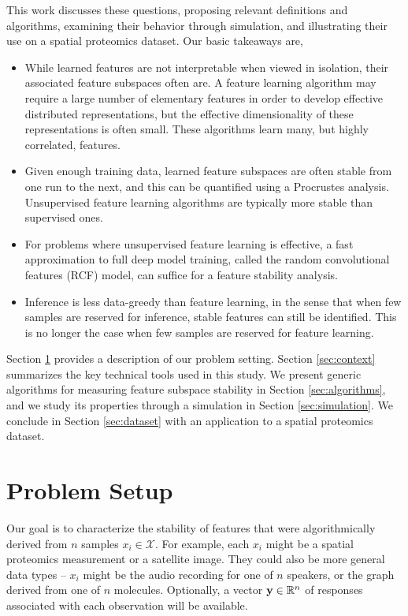 This work discusses these questions, proposing relevant definitions and
algorithms, examining their behavior through simulation, and illustrating their
use on a spatial proteomics dataset. Our basic takeaways are,

\begin{itemize}
\item While learned features are not interpretable when viewed in isolation,
  their associated feature subspaces often are. A feature learning algorithm may
  require a large number of elementary features in order to develop effective
  distributed representations, but the effective dimensionality of these
  representations is often small. These algorithms learn many, but highly
  correlated, features.
\item Given enough training data, learned feature subspaces are often stable
  from one run to the next, and this can be quantified using a Procrustes
  analysis. Unsupervised feature learning algorithms are typically more stable
  than supervised ones.
\item For problems where unsupervised feature learning is effective, a fast
  approximation to full deep model training, called the random convolutional
  features (RCF) model, can suffice for a feature stability analysis.
\item Inference is less data-greedy than feature learning, in the sense that
  when few samples are reserved for inference, stable features can still be
  identified. This is no longer the case when few samples are reserved for
  feature learning.
\end{itemize}

Section \ref{sec:psetup} provides a description of our problem setting. Section
\ref{sec:context} summarizes the key technical tools used in this study. We
present generic algorithms for measuring feature subspace stability in Section
\ref{sec:algorithms}, and we study its properties through a simulation in
Section \ref{sec:simulation}. We conclude in Section \ref{sec:dataset} with an
application to a spatial proteomics dataset.

\section{Problem Setup}
\label{sec:psetup}

Our goal is to characterize the stability of features that were algorithmically
derived from $n$ samples $x_i \in \mathcal{X}$. For example, each $x_{i}$ might
be a spatial proteomics measurement or a satellite image. They could also be
more general data types -- $x_i$ might be the audio recording for one of $n$
speakers, or the graph derived from one of $n$ molecules. Optionally, a vector
$\mathbf{y}\in \mathbb{R}^{n}$ of responses associated with each observation will be
available.


